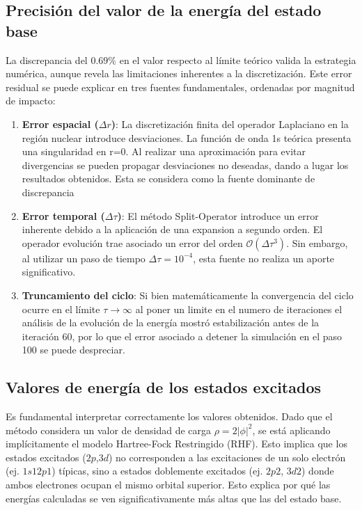 \documentclass[aps,twocolumn,preprintnumbers]{revtex4}
\begin{document}
  \subsection{Precisión del valor de la energía del estado base}

  La discrepancia del $0.69\%$ en el valor respecto al límite teórico valida la estrategia numérica, aunque revela las limitaciones inherentes a la discretización. Este error residual se puede explicar en tres fuentes fundamentales, ordenadas por magnitud de impacto:

  \begin{enumerate}
    \item \textbf{Error espacial ($\Delta r$)}: La discretización finita del operador Laplaciano en la región nuclear introduce desviaciones. La función de onda 1s teórica presenta una singularidad en r=0. Al realizar una aproximación para evitar divergencias se pueden propagar desviaciones no deseadas, dando a lugar los resultados obtenidos. Esta se considera como la fuente dominante de discrepancia
    \item \textbf{Error temporal ($\Delta \tau$)}: El método Split-Operator introduce un error inherente debido a la aplicación de una expansion a segundo orden. El operador evolución trae asociado un error del orden $\mathcal{O}(\Delta\tau^3)$. Sin embargo, al utilizar un paso de tiempo $\Delta\tau = 10^{-4}$, esta fuente no realiza un aporte significativo.
    \item \textbf{Truncamiento del ciclo}: Si bien matemáticamente la convergencia del ciclo ocurre en el límite $\tau \to \infty$ al poner un limite en el numero de iteraciones el análisis de la evolución de la energía mostró estabilización antes de la iteración 60, por lo que el error asociado a detener la simulación en el paso 100 se puede despreciar.
  \end{enumerate}

  \subsection{Valores de energía de los estados excitados}

  Es fundamental interpretar correctamente los valores obtenidos. Dado que el método considera un valor de densidad de carga $\rho = 2|\phi|^2$, se está aplicando implícitamente el modelo Hartree-Fock Restringido (RHF). Esto implica que los estados excitados ($2p$,$3d$) no corresponden a las excitaciones de un solo electrón (ej. $1s12p1$) típicas, sino a estados doblemente excitados (ej. $2p2$, $3d2$) donde ambos electrones ocupan el mismo orbital superior. Esto explica por qué las energías calculadas se ven significativamente más altas que las del estado base.
\end{document}

